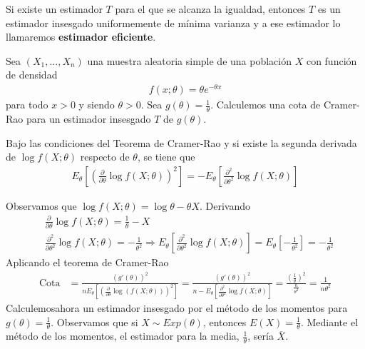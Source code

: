 \begin{obs}
Si existe un estimador $T$ para el que se alcanza la igualdad, entonces $T$ es un estimador insesgado uniformemente de mínima varianza y a ese estimador lo llamaremos \textbf{estimador eficiente}.
\end{obs}

\begin{ejemplo}
Sea $(X_1,...,X_n)$ una muestra aleatoria simple de una población $X$ con función de densidad
\begin{align*}
    f(x;\theta) = \theta e^{-\theta x}
\end{align*}
para todo $x > 0$ y siendo $\theta > 0$. Sea $g(\theta) = \frac{1}{\theta}$. Calculemos una cota de Cramer-Rao para un estimador insesgado $T$ de $g(\theta)$.
\begin{obs}
Bajo las condiciones del Teorema de Cramer-Rao y si existe la segunda derivada de $\log f(X;\theta)$ respecto de $\theta$, se tiene que
\begin{align*}
    E_{\theta}\left[ \left( \frac{\partial}{\partial \theta} \log f(X;\theta)\right)^2\right] = - E_{\theta}\left[  \frac{\partial^2}{\partial \theta^2} \log f(X;\theta) \right]
\end{align*}
\end{obs}
Observamos que $\log f(X;\theta) = \log \theta - \theta X$. Derivando
\begin{align*}
    &\frac{\partial}{\partial \theta}\log f(X;\theta) = \frac{1}{\theta} - X \\
   & \frac{\partial^2}{\partial \theta^2} \log f(X;\theta) = - \frac{1}{\theta^2} \Longrightarrow E_{\theta}\left[ \frac{\partial^2}{\partial \theta^2} \log f(X;\theta) \right] = E_{\theta}\left[ -\frac{1}{\theta^2}\right] =  -\frac{1}{\theta^2}
\end{align*}
Aplicando el teorema de Cramer-Rao
\begin{align*}
    \text{Cota} &= \frac{(g'(\theta))^2}{nE_{\theta}\left[ \left( \frac{\partial}{\partial \theta}\log(f(X;\theta)) \right)^2\right]} = \frac{(g'(\theta))^2}{n- E_{\theta}\left[  \frac{\partial^2}{\partial \theta^2} \log f(X;\theta) \right]} =
   \frac{\left(\frac{1}{\theta} \right)^2}{\frac{n}{\theta^2}} = \frac{1}{n \theta^2}
\end{align*}
Calculemosahora un estimador insesgado por el método de los momentos para $g(\theta) = \frac{1}{\theta}$. Observamos que si $X \sim Exp(\theta)$, entonces $E(X) = \frac{1}{\theta}$. Mediante el método de los momentos, el estimador para la media, $\frac{1}{\theta}$, sería $\overline{X}$.

\end{ejemplo}
